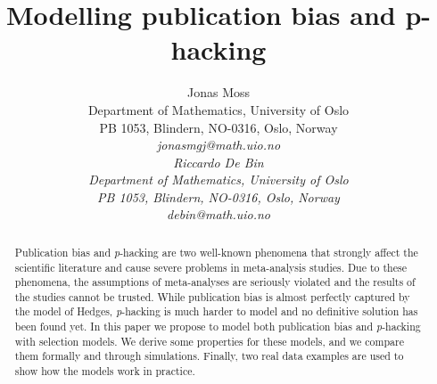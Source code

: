 \documentclass{article}
\title{Modelling publication bias and p-hacking}
\author{
  Jonas Moss \\
  Department of Mathematics, University of Oslo\\
  PB 1053, Blindern, NO-0316, Oslo, Norway \\
  \it{jonasmgj@math.uio.no} \\ 
     \And
  Riccardo De Bin \\
  Department of Mathematics, University of Oslo\\
  PB 1053, Blindern, NO-0316, Oslo, Norway \\
  \it{debin@math.uio.no} \\ 
}
\theoremstyle{plain}
\theoremstyle{definition}
\begin{document}
\maketitle
\begin{abstract}
Publication bias and \textit{p}-hacking are two well-known phenomena that strongly affect the scientific literature and cause severe problems in meta-analysis studies. Due to these phenomena, the assumptions of meta-analyses are seriously violated and the results of the studies cannot be trusted. While publication bias is almost perfectly captured by the model of Hedges, \textit{p}-hacking is much harder to model and no definitive solution has been found yet. In this paper we propose to model both publication bias and \textit{p}-hacking with selection models. We derive some properties for these models, and we compare them formally and through simulations. Finally, two real data examples are used to show how the models work in practice.
\end{abstract}








\end{document}
